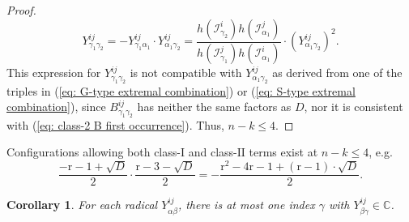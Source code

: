 \documentclass[10pt]{article}
\newtheorem{cor}{Corollary}%
\theoremstyle{remark}%
\theoremstyle{definition}%
\begin{document}
\begin{proof}
\begin{equation*} 
Y_{\gamma_{1}\gamma_{2}}^{ij} = -Y_{\gamma_{1}\alpha_{1}}^{ij}\cdot Y_{\alpha_{1}\gamma_{2}}^{ij} = \frac{h(\mathcal{I}_{\gamma_{2}}^{i})h(\mathcal{I}_{\alpha_{1}}^{j})}{h(\mathcal{I}_{\gamma_{1}}^{j})h(\mathcal{I}_{\alpha_{1}}^{i})} \cdot (Y_{\alpha_{1}\gamma_{2}}^{ij})^2.
\end{equation*} 
This expression for $Y_{\gamma_{1}\gamma_{2}}^{ij}$ is not compatible with $Y_{\alpha_{1}\gamma_{2}}^{ij}$ as derived from one of the triples in (\ref{eq: G-type extremal combination}) or (\ref{eq: S-type extremal combination}), since $B_{\gamma_{1}\gamma_{2}}^{ij}$ has neither the same factors as $D$, nor it is consistent with (\ref{eq: class-2 B first occurrence}). Thus, $n-k\leq 4$. 
\end{proof}
Configurations allowing both class-$\mathrm{I}$ and class-$\mathrm{II}$ terms exist at $n-k\leq4$, e.g. 
\begin{equation*}
    \frac{-\mathrm{r}-1+\sqrt{D}}{2}\cdot\frac{\mathrm{r}-3-\sqrt{D}}{2}=-\frac{\mathrm{r}^{2}-4\mathrm{r}-1+(\mathrm{r}-1)\cdot\sqrt{D}}{2}.
\end{equation*}
\begin{cor}
\label{cor: only one constant factor per Y-term} For each radical $Y_{\alpha\beta}^{ij}$, there is at most one index $\gamma$ with $Y_{\beta\gamma}^{ij}\in\mathbb{C}$. 
\end{cor}
\end{document}
